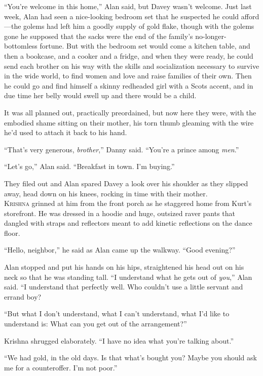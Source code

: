 \documentclass{article}
\begin{document}
``You're welcome in this home,'' Alan said, but Davey wasn't welcome. 
Just last week, Alan had seen a nice-looking bedroom set that he
suspected he could afford---the golems had left him a goodly supply of
gold flake, though with the golems gone he supposed that the sacks
were the end of the family's no-longer-bottomless fortune.  But with
the bedroom set would come a kitchen table, and then a bookcase, and a
cooker and a fridge, and when they were ready, he could send each
brother on his way with the skills and socialization necessary to
survive in the wide world, to find women and love and raise families
of their own.  Then he could go and find himself a skinny redheaded
girl with a Scots accent, and in due time her belly would swell up and
there would be a child.

It was all planned out, practically preordained, but now here they
were, with the embodied shame sitting on their mother, his torn thumb
gleaming with the wire he'd used to attach it back to his hand.

``That's very generous, \textit{brother},'' Danny said.  ``You're a
prince among \textit{men}.''

``Let's go,'' Alan said.  ``Breakfast in town.  I'm buying.''

They filed out and Alan spared Davey a look over his shoulder as they
slipped away, head down on his knees, rocking in time with their
mother.
\\
\lettrine[lines=3, lhang=.5, nindent=0pt, findent=2pt]{K}{rishna} grinned at him from the front porch as he staggered home from
Kurt's storefront.  He was dressed in a hoodie and huge, outsized
raver pants that dangled with straps and reflectors meant to add
kinetic reflections on the dance floor.

``Hello, neighbor,'' he said as Alan came up the walkway.  ``Good
evening?''

Alan stopped and put his hands on his hips, straightened his head out
on his neck so that he was standing tall.  ``I understand what he gets
out of \textit{you},'' Alan said.  ``I understand that perfectly well. 
Who couldn't use a little servant and errand boy?

``But what I don't understand, what I can't understand, what I'd like
to understand is:  What can you get out of the arrangement?''

Krishna shrugged elaborately.  ``I have no idea what you're talking
about.''

``We had gold, in the old days.  Is that what's bought you?  Maybe you
should ask me for a counteroffer.  I'm not poor.''
\end{document}
